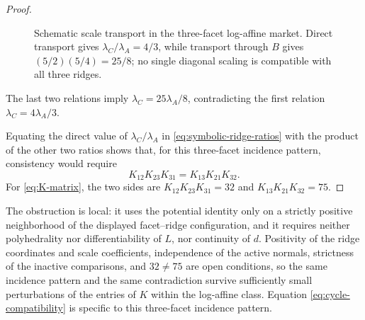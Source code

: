 \documentclass[11pt,a4paper,fleqn]{article}
\theoremstyle{plain}
\theoremstyle{definition}
\begin{document}
\begin{proof}
\begin{figure}[tb]
\centering
{}
\caption{Schematic scale transport in the three-facet log-affine market. Direct transport gives $\lambda_C/\lambda_A=4/3$, while transport through $B$ gives $(5/2)(5/4)=25/8$; no single diagonal scaling is compatible with all three ridges.}
\label{fig:three-facet-schematic}
\end{figure}

The last two relations imply $\lambda_C=25\lambda_A/8$, contradicting the first relation $\lambda_C=4\lambda_A/3$.

Equating the direct value of $\lambda_C/\lambda_A$ in \eqref{eq:symbolic-ridge-ratios} with the product of the other two ratios shows that, for this three-facet incidence pattern, consistency would require
\begin{equation}\label{eq:cycle-compatibility}
K_{12}K_{23}K_{31}=K_{13}K_{21}K_{32}.
\end{equation}
For \eqref{eq:K-matrix}, the two sides are $K_{12}K_{23}K_{31}=32$ and $K_{13}K_{21}K_{32}=75$.
\end{proof}

The obstruction is local: it uses the potential identity only on a strictly positive neighborhood of the displayed facet--ridge configuration, and it requires neither polyhedrality nor differentiability of $L$, nor continuity of $d$. Positivity of the ridge coordinates and scale coefficients, independence of the active normals, strictness of the inactive comparisons, and $32\ne75$ are open conditions, so the same incidence pattern and the same contradiction survive sufficiently small perturbations of the entries of $K$ within the log-affine class. Equation \eqref{eq:cycle-compatibility} is specific to this three-facet incidence pattern.
\end{document}
